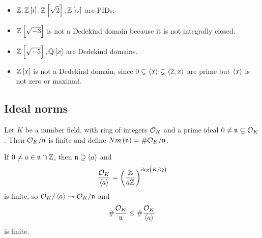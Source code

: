 \begin{example*}
\hfill
\begin{itemize}
\item $ \Z, \Z\sbr{i}, \Z\sbr{\sqrt{2}}, \Z\sbr{\omega} $ are PIDs.
\item $ \Z\sbr{\sqrt{-3}} $ is not a Dedekind domain because it is not integrally closed.
\item $ \Z\sbr{\sqrt{-5}}, \Q\sbr{x} $ are Dedekind domains.
\item $ \Z\sbr{x} $ is not a Dedekind domain, since $ 0 \subsetneq \left\langle x \right\rangle \subsetneq \left\langle 2, x \right\rangle $ are prime but $ \left\langle x \right\rangle $ is not zero or maximal.
\end{itemize}
\end{example*}

\subsection{Ideal norms}

\begin{definition}
Let $ K $ be a number field, with ring of integers $ \mathcal{O}_K $ and a prime ideal $ 0 \ne \mathfrak{n} \subseteq \mathcal{O}_K $. Then $ \mathcal{O}_K / \mathfrak{n} $ is finite and define $ Nm\br{\nn} = \#\OO_K / \nn $.
\end{definition}

If $ 0 \ne a \in \mathfrak{n} \cap \mathbb{Z} $, then $ \mathfrak{n} \supseteq \left\langle a \right\rangle $ and
$$ \dfrac{\OO_K}{\abr{a}} = \br{\dfrac{\Z}{a\Z}}^{\deg\br{K / \Q}} $$
is finite, so $ \mathcal{O}_K / \left\langle a \right\rangle \twoheadrightarrow \mathcal{O}_K / \mathfrak{n} $ and
$$ \#\dfrac{\mathcal{O}_K}{\mathfrak{n}} \le \#\dfrac{\mathcal{O}_K}{\left\langle a \right\rangle} $$
is finite.

\pagebreak

